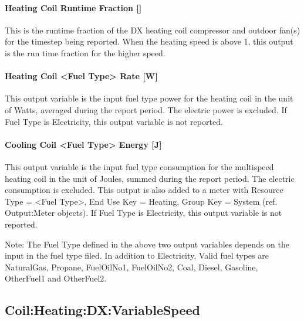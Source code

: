 \paragraph{Heating Coil Runtime Fraction {[]}}

This is the runtime fraction of the DX heating coil compressor and outdoor fan(s) for the timestep being reported. When the heating speed is above 1, this output is the run time fraction for the higher speed.

\paragraph{Heating Coil \textless{}Fuel Type\textgreater{} Rate {[}W{]}}\label{heating-coil-fuel-type-rate-w}

This output variable is the input fuel type power for the heating coil in the unit of Watts, averaged during the report period. The electric power is excluded. If Fuel Type is Electricity, this output variable is not reported.

\paragraph{Cooling Coil \textless{}Fuel Type\textgreater{} Energy {[}J{]}}\label{cooling-coil-fuel-type-energy-j-1}

This output variable is the input fuel type consumption for the multispeed heating coil in the unit of Joules, summed during the report period. The electric consumption is excluded. This output is also added to a meter with Resource Type = \textless{}Fuel Type\textgreater{}, End Use Key = Heating, Group Key = System (ref. Output:Meter objects). If Fuel Type is Electricity, this output variable is not reported.

Note: The Fuel Type defined in the above two output variables depends on the input in the fuel type filed. In addition to Electricity, Valid fuel types are NaturalGas, Propane, FuelOilNo1, FuelOilNo2, Coal, Diesel, Gasoline, OtherFuel1 and OtherFuel2.

\subsection{Coil:Heating:DX:VariableSpeed}\label{coilheatingdxvariablespeed}

